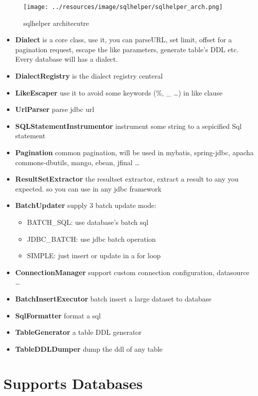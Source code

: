 \documentclass[
]{book}
\providecommand{\tightlist}{%
  \setlength{\itemsep}{0pt}\setlength{\parskip}{0pt}}
\begin{document}
\begin{figure}
\centering
\texttt{[image: ../resources/image/sqlhelper/sqlhelper\_arch.png]}
\caption{sqlhelper architecutre}
\end{figure}

\begin{itemize}
\tightlist
\item
  \textbf{Dialect} is a core class, use it, you can parseURL, set limit, offset for a pagination request, escape the like parameters, generate table's DDL etc. Every database will has a dialect.
\item
  \textbf{DialectRegistry} is the dialect registry centeral
\item
  \textbf{LikeEscaper} use it to avoid some keywords (\%, \_ \ldots) in like clause
\item
  \textbf{UrlParser} parse jdbc url
\item
  \textbf{SQLStatementInstrumentor} instrument some string to a sepicified Sql statement
\item
  \textbf{Pagination} common pagination, will be used in mybatis, spring-jdbc, apacha commons-dbutils, mango, ebean, jfinal \ldots{}
\item
  \textbf{ResultSetExtractor} the resultset extractor, extract a result to any you expected. so you can use in any jdbc framework
\item
  \textbf{BatchUpdater} supply 3 batch update mode:

  \begin{itemize}
  \tightlist
  \item
    BATCH\_SQL: use database's batch sql
  \item
    JDBC\_BATCH: use jdbc batch operation
  \item
    SIMPLE: just insert or update in a for loop
  \end{itemize}
\item
  \textbf{ConnectionManager} support custom connection configuration, datasource \ldots{}
\item
  \textbf{BatchInsertExecutor} batch insert a large dataset to database
\item
  \textbf{SqlFormatter} format a sql
\item
  \textbf{TableGenerator} a table DDL generator
\item
  \textbf{TableDDLDumper} dump the ddl of any table
\end{itemize}

\hypertarget{sqlhelper_supported_databases}{%
\section{Supports Databases}\label{sqlhelper_supported_databases}}
\end{document}
